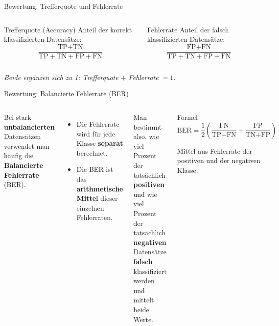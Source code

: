 \begin{frame}{Bewertung: Trefferquote und Fehlerrate}
\begin{columns}
\begin{blockC1}{Trefferquote (Accuracy)}
Anteil der korrekt klassifizierten Datensätze:
\[
  \frac{\text{TP} + \text{TN}}
       {\text{TP} + \text{TN} + \text{FP} + \text{FN}}
\]
\end{blockC1}

\begin{blockC2}{Fehlerrate}
Anteil der falsch klassifizierten Datensätze:
\[
  \frac{\text{FP} + \text{FN}}
       {\text{TP} + \text{TN} + \text{FP} + \text{FN}}
\]
\end{blockC2}
\end{columns}

\vspace{0.6em}
\centering
{\footnotesize\itshape Beide ergänzen sich zu 1: Trefferquote $+$
Fehlerrate $= 1$.}
\end{frame}


\begin{frame}{Bewertung: Balancierte Fehlerrate (BER)}
\begin{columns}
Bei stark \textbf{unbalancierten} Datensätzen verwendet man häufig die
\textbf{Balancierte Fehlerrate} (BER).

\vspace{0.4em}
\begin{itemize}
  \item Die Fehlerrate wird für jede Klasse \textbf{separat} berechnet.
  \item Die BER ist das \textbf{arithmetische Mittel} dieser einzelnen
        Fehlerraten.
\end{itemize}

\vspace{0.4em}
Man bestimmt also, wie viel Prozent der tatsächlich \textbf{positiven} und
wie viel Prozent der tatsächlich \textbf{negativen} Datensätze
\textbf{falsch} klassifiziert werden und mittelt beide Werte.

\begin{blockC1}{Formel}
\[
  \text{BER} = \frac{1}{2}\!\left(
    \frac{\text{FN}}{\text{TP} + \text{FN}}
    +
    \frac{\text{FP}}{\text{TN} + \text{FP}}
  \right)
\]
\vspace{0.2em}

{\footnotesize Mittel aus Fehlerrate der positiven und der negativen
Klasse.}
\end{blockC1}
\end{columns}
\end{frame}

